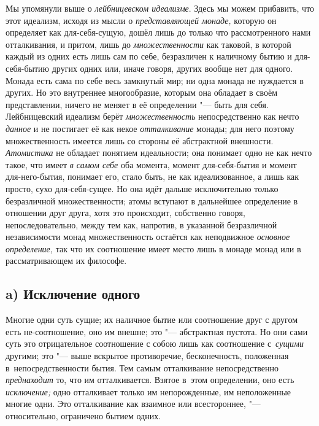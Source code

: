 
Мы упомянули выше о {\em лейбницевском идеализме}. Здесь
мы можем прибавить, что этот идеализм, исходя из мысли о
{\em представляющей монаде,} которую он определяет как
для-себя-сущую, дошёл лишь до только что рассмотренного нами отталкивания,
и притом, лишь до {\em множественности} как таковой, в
которой каждый из одних есть лишь сам по себе, безразличен к наличному
бытию и для-себя-бытию других одних или, иначе говоря, других вообще нет
для одного. Монада есть сама по себе весь замкнутый мир; ни одна монада не
нуждается в других. Но это внутреннее многообразие, которым она обладает в
своём представлении, ничего не меняет в её определении "--- быть для себя.
Лейбницевский идеализм берёт {\em множественность}
непосредственно как нечто {\em данное} и не постигает
её как некое {\em отталкивание} монады; для него
поэтому множественность имеется лишь со стороны её абстрактной внешности.
{\em Атомистика} не обладает понятием идеальности; она
понимает одно не как нечто такое, что имеет {\em в
самом себе} оба момента, момент для-себя-бытия и момент для-него-бытия,
понимает его, стало быть, не как идеализованное, а лишь как просто, сухо
для-себя-сущее. Но она идёт дальше исключительно только безразличной
множественности; атомы вступают в дальнейшее определение в отношении друг
друга, хотя это происходит, собственно говоря, непоследовательно, между тем
как, напротив, в указанной безразличной независимости монад множественность
остаётся как неподвижное {\em основное определение,}
так что их соотношение имеет место лишь в монаде монад или в
рассматривающем их философе.

\bigskip


\subsection[a) Исключение одного]{a) Исключение одного}

Многие одни суть сущие; их наличное бытие или соотношение друг с другом есть
не-соотношение, оно им внешне; это "--- абстрактная пустота. Но они сами суть
это отрицательное соотношение с собою лишь как соотношение с~{\em сущими}
другими; это "--- выше вскрытое противоречие, бесконечность, положенная
в~непосредственности бытия. Тем самым отталкивание непосредственно {\em
преднаходит} то, что им отталкивается. Взятое в~этом определении, оно есть
{\em исключение;} одно отталкивает только им непорожденные, им неположенные
многие одни. Это отталкивание как взаимное или всестороннее, "--- относительно,
ограничено бытием одних.

